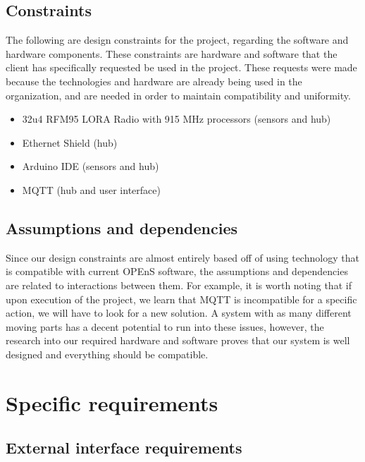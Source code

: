 \documentclass[onecolumn, draftclsnofoot,10pt, compsoc]{IEEEtran}
\begin{document}
	\subsection{Constraints}
	The following are design constraints for the project, regarding the software and hardware components.
	These constraints are hardware and software that the client has specifically requested be used in the project.
	These requests were made because the technologies and hardware are already being used in the organization, and are needed in order to maintain compatibility and uniformity. 
	\begin{itemize}
		\item{32u4 RFM95 LORA Radio with 915 MHz processors (sensors and hub)}
		\item{Ethernet Shield (hub)}
		\item{Arduino IDE (sensors and hub)}
		\item{MQTT (hub and user interface)}
	\end{itemize}    
	\subsection{Assumptions and dependencies}
	Since our design constraints are almost entirely based off of using technology that is compatible with current OPEnS software, the assumptions and dependencies are related to interactions between them. 
	For example, it is worth noting that if upon execution of the project, we learn that MQTT is incompatible for a specific action, we will have to look for a new solution. 
	A system with as many different moving parts has a decent potential to run into these issues, however, the research into our required hardware and software proves that our system is well designed and everything should be compatible. 
	
	\section{Specific requirements}
	\subsection{External interface requirements}
\end{document}

